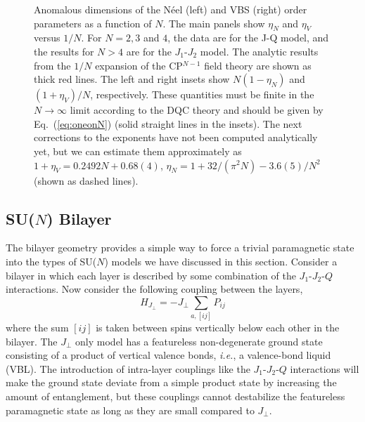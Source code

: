 \documentclass[range]{ar2e}
\begin{document}
\begin{figure}
\centerline{}
 \caption{ \label{fig:exp} Anomalous dimensions of the N\'eel (left)
    and VBS (right)
  order parameters as a function of $N$. The main panels show $\eta_N$ and $\eta_V$ versus $1/N$. For $N=2,3$ and $4$, the data are 
  for the J-Q model, and the results for $N>4$ are for the $J_1$-$J_2$ model. The analytic results 
  from the $1/N$ expansion of the CP$^{N-1}$ field theory are shown as thick red lines. The left and right insets 
  show $N(1-\eta_N)$ and $(1+\eta_V)/N$, respectively. These quantities must be finite in the  $N\rightarrow \infty$ 
  limit according to the DQC theory and should be given by Eq.~(\ref{eq:oneonN}) (solid straight lines in the insets). 
  The next corrections to the exponents have not been computed analytically yet, but we can estimate them approximately 
  as $1+\eta_V = 0.2492 N + 0.68(4)$, $\eta_N = 1+32/(\pi^2 N)-3.6(5)/N^2$ (shown as dashed lines).}
\end{figure}

\subsection{SU($N$) Bilayer}
\label{ss:bilN}

The bilayer geometry provides a simple way to force a trivial paramagnetic
state into the types of SU($N$) models we have discussed in this
section. Consider a bilayer in which each layer is described by some
combination of the $J_1$-$J_2$-$Q$ interactions. Now consider the
following coupling between the layers,
\begin{equation}
 H_{J_\perp} = -J_\perp \sum_{a,[ij]} P_{ij}
\end{equation}
where the sum $[ij]$ is taken between spins vertically below each other
in the bilayer. The $J_\perp$ only model has a featureless non-degenerate ground state
consisting of a product of vertical valence bonds, {\em i.e.}, a valence-bond liquid (VBL). The introduction of intra-layer couplings like the $J_1$-$J_2$-$Q$ interactions will
make the ground state deviate from a simple product state by
increasing the amount of entanglement, but these couplings
 cannot destabilize the featureless paramagnetic
state as long as they are small compared to $J_\perp$. 
\end{document}
